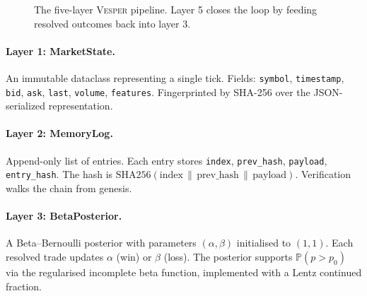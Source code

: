 \documentclass[11pt,a4paper]{article}
\newcommand{\gld}[1]{\textcolor{goldshiny}{#1}}
\theoremstyle{definition}
\begin{document}
\begin{figure}[ht]
\centering
{}
\caption{The five-layer \textsc{Vesper} pipeline. Layer 5 closes the loop by feeding resolved outcomes back into layer 3.}
\label{fig:pipeline}
\end{figure}

\paragraph{Layer 1: MarketState.}
An immutable dataclass representing a single tick. Fields: \texttt{symbol}, \texttt{timestamp}, \texttt{bid}, \texttt{ask}, \texttt{last}, \texttt{volume}, \texttt{features}. Fingerprinted by SHA-256 over the JSON-serialized representation.

\paragraph{Layer 2: MemoryLog.}
Append-only list of entries. Each entry stores \texttt{index}, \texttt{prev\_hash}, \texttt{payload}, \texttt{entry\_hash}. The hash is $\mathrm{SHA256}(\text{index} \,\|\, \text{prev\_hash} \,\|\, \text{payload})$. Verification walks the chain from genesis.

\paragraph{Layer 3: BetaPosterior.}
A Beta--Bernoulli posterior with parameters $(\alpha, \beta)$ initialised to $(1, 1)$. Each resolved trade updates $\alpha$ (win) or $\beta$ (loss). The posterior supports $\mathbb{P}(p > p_0)$ via the regularised incomplete beta function, implemented with a Lentz continued fraction.
\end{document}
